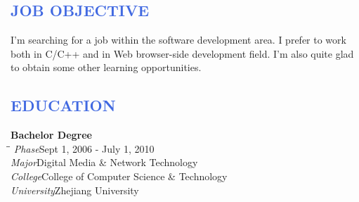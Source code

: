 \documentclass{res}
\begin{document}
\address{\bf  ADDRESS\\Lianzhuang Apart.\\Binjiang District\\Hangzhou,Zhejiang\\310053}
\address{\bf EMAIL\&PHONE\\E-mail: blueabysm@gmail.com\\Cellphone:  13221018836}
                                  
\begin{resume}

\textcolor{RoyalBlue}{
\section{JOB OBJECTIVE}
}
    I\rq{}m searching for a job within the software development area. I prefer to work both in C/C++ and in Web browser-side development field. I\rq{}m also quite glad to obtain some other learning opportunities.

\textcolor{RoyalBlue}{
\section{EDUCATION}
}
\vspace{-0.1in}
\begin{tabbing}
{\bf Bachelor Degree}\\
\hspace{2.3in}\= \hspace{2.6in}\= \kill
       {\it Phase}\>Sept 1, 2006 - July 1, 2010\\
       {\it Major}\>Digital Media \& Network Technology \\
       {\it College}\>College of Computer Science \& Technology \\
       {\it University}\>Zhejiang University\\
\end{tabbing}
\vspace{-20pt}

\textcolor{RoyalBlue}{
}
\end{resume}
\end{document}
